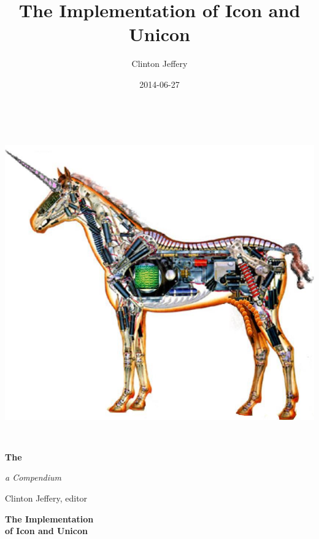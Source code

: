 \documentclass[letterpaper,twoside,11pt]{book}
\title{The Implementation of Icon and Unicon}
\author{Clinton Jeffery}
\date{2014-06-27}
\newcommand*{\TitleFont}{%
      \usefont{\encodingdefault}{\rmdefault}{b}{n}%
      \fontsize{256}{40}%
      \selectfont}
\begin{document}
\clearpage\clearpage\setcounter{page}{1}\pagestyle{KonvertFolgeii}
\thispagestyle{Konverti}
\begin{center}
\includegraphics[width=5.9992in,height=5.3402in]{ib-img/ib-img001.jpg}
\end{center}
{\color{black}
\bfseries\Huge
The \vspace{0.15in}

\noindent \TitleFont
\colorbox{blue}{\makebox[6in][r]{\parbox{6in}{\center\textcolor{white}{Implementation of\\ Icon and Unicon} \vspace{0.25in}}}}
}

\vspace{0.10in}

{\raggedleft\itshape\huge
a Compendium
\par}

\bigskip

{\raggedleft\LARGE
Clinton Jeffery, editor
\par}

\clearpage\setcounter{page}{1}\pagestyle{UnnumberedKonvertFolgeii}
\parbox{1in}{}

\clearpage

\bigskip
\bigskip
\bigskip

{\centering\bfseries\Huge
The Implementation\\
of Icon and Unicon
\par}
\end{document}

